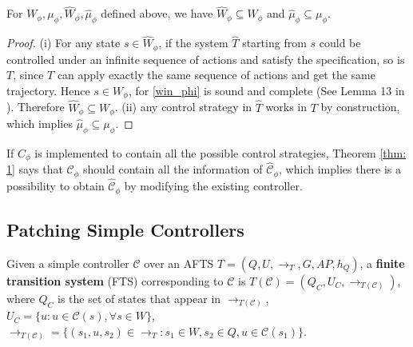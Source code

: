 \begin{theorem}
	For $ W_{\phi}, \mu_{\phi}, \widehat{W}_{\phi}, \widehat{\mu}_{\phi} $ defined above, we have $ \widehat{W}_{\phi} \subseteq W_{\phi}  $ and $ \widehat{\mu}_{\phi} \subseteq \mu_{\phi}$\label{thm: 1}.
\end{theorem}

\begin{proof}
	(i) For any state $ s\in \widehat{W}_{\phi} $, if the system $ \widehat{T} $ starting from $ s $ could be controlled under an infinite sequence of actions and satisfy the specification, so is $ T $, since $ T $ can apply exactly the same sequence of actions and get the same trajectory. Hence $ s\in W_{\phi} $, for \eqref{win_phi} is sound and complete (See Lemma 13 in \cite{Nilsson2017}). Therefore $ \widehat{W}_{\phi}\subseteq W_{\phi} $. (ii) any control strategy in $ \widehat{T} $ works in $ T $ by construction, which implies $ \widehat{\mu}_{\phi} \subseteq \mu_{\phi}$.
\end{proof}

If $ C_{\phi} $ is implemented to contain all the possible control strategies, Theorem \ref{thm: 1} says that $ \mathcal{C}_{\phi} $ should contain all the information of $ \widehat{\mathcal{C}}_{\phi} $, which implies there is a possibility to obtain $ \widehat{\mathcal{C}}_{\phi} $ by modifying the existing controller.



\subsection{Patching Simple Controllers}
\label{sec:patching_simple}
\begin{definition}
	Given a simple controller $ \mathcal{C} $ over an AFTS $T = (Q,U,\rightarrow_T, G,AP,h_Q) $, a \textbf{finite transition system} (FTS) corresponding to $ \mathcal{C} $ is $T(\mathcal{C}) = (Q_C, U_C, \rightarrow_{T(\mathcal{C})})$, where $ Q_C $ is the set of states that appear in $ \rightarrow_{T(\mathcal{C})} $, $ U_C=\{u: u\in \mathcal{C}(s), \forall s\in W\} $, $ \rightarrow_{T(\mathcal{C})} =\{(s_1,u,s_2)\in \rightarrow_T: s_1\in W,s_2\in Q, u\in \mathcal{C}(s_1)\} $. \label{def:T_C}
\end{definition}

